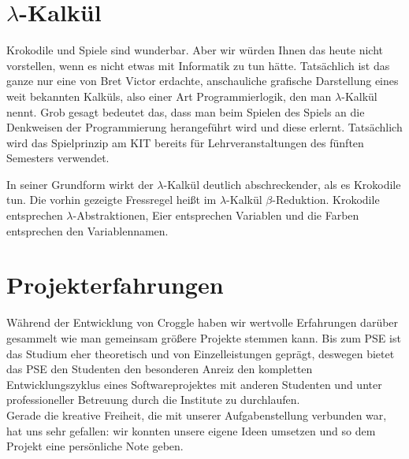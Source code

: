 \documentclass{scrartcl}
\begin{document}
	\section{$\lambda$-Kalkül}
	Krokodile und Spiele sind wunderbar.
	Aber wir würden Ihnen das heute nicht vorstellen, wenn es nicht etwas mit Informatik zu tun hätte.
	Tatsächlich ist das ganze nur eine von Bret Victor erdachte, anschauliche grafische Darstellung eines weit bekannten Kalküls, also einer Art Programmierlogik, den man $\lambda$-Kalkül nennt.
	Grob gesagt bedeutet das, dass man beim Spielen des Spiels an die Denkweisen der Programmierung herangeführt wird und diese erlernt.
	Tatsächlich wird das Spielprinzip am KIT bereits für Lehrveranstaltungen des fünften Semesters verwendet.

	In seiner Grundform wirkt der $\lambda$-Kalkül deutlich abschreckender, als es Krokodile tun.
	Die vorhin gezeigte Fressregel heißt im $\lambda$-Kalkül $\beta$-Reduktion.
	Krokodile entsprechen $\lambda$-Abstraktionen, Eier entsprechen Variablen und die Farben entsprechen den Variablennamen.

	\section{Projekterfahrungen}

	Während der Entwicklung von Croggle haben wir wertvolle Erfahrungen darüber gesammelt wie man gemeinsam größere Projekte stemmen kann. Bis zum PSE ist das Studium eher theoretisch und von Einzelleistungen geprägt, deswegen bietet das PSE den Studenten den besonderen Anreiz den kompletten Entwicklungszyklus eines Softwareprojektes mit anderen Studenten und unter professioneller Betreuung durch die Institute zu durchlaufen. \\
	Gerade die kreative Freiheit, die mit unserer Aufgabenstellung verbunden war, hat uns sehr gefallen: wir konnten unsere eigene Ideen umsetzen und so dem Projekt eine persönliche Note geben. \\

	
\end{document}

